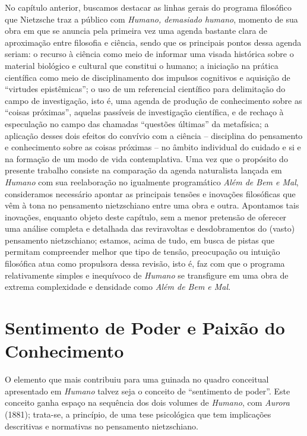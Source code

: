 \documentclass[
	12pt,				%
	openright,			%
	oneside,			%
	a4paper,			%
	english,			%
	french,				%
	spanish,			%
	brazil				%
	]{abntex2}
\begin{document}
No capítulo anterior, buscamos destacar as linhas gerais do programa filosófico que Nietzsche traz a público com \textit{Humano, demasiado humano}, momento de sua obra em que se anuncia pela primeira vez uma agenda bastante clara de aproximação entre filosofia e ciência, sendo que os principais pontos dessa agenda seriam: o recurso à ciência como meio de informar uma visada histórica sobre o material biológico e cultural que constitui o humano; a iniciação na prática científica como meio de disciplinamento dos impulsos cognitivos e aquisição de “virtudes epistêmicas”; o uso de um referencial científico para delimitação do campo de investigação, isto é, uma agenda de produção de conhecimento sobre as “coisas próximas”, aquelas passíveis de investigação científica, e de rechaço à especulação no campo das chamadas “questões últimas” da metafísica; a aplicação desses dois efeitos do convívio com a ciência – disciplina do pensamento e conhecimento sobre as coisas próximas – no âmbito individual do cuidado e si e na formação de um modo de vida contemplativa. Uma vez que o propósito do presente trabalho consiste na comparação da agenda naturalista lançada em \textit{Humano} com sua reelaboração no igualmente programático \textit{Além de Bem e Mal}, consideramos necessário apontar as principais tensões e inovações filosóficas que vêm à tona no pensamento nietzschiano entre uma obra e outra. Apontamos tais inovações, enquanto objeto deste capítulo, sem a menor pretensão de oferecer uma análise completa e detalhada das reviravoltas e desdobramentos do (vasto) pensamento nietzschiano; estamos, acima de tudo, em busca de pistas que permitam compreender melhor que tipo de tensão, preocupação ou intuição filosófica atua como propulsora dessa revisão, isto é, faz com que o programa relativamente simples e inequívoco de \textit{Humano} se transfigure em uma obra de extrema complexidade e densidade como \textit{Além de Bem e Mal}.

\section{Sentimento de Poder e Paixão do Conhecimento }

O elemento que mais contribuiu para uma guinada no quadro conceitual apresentado em \textit{Humano} talvez seja o conceito de “sentimento de poder”. Este conceito ganha espaço na sequência dos dois volumes de \textit{Humano}, com \textit{Aurora} (1881); trata-se, a princípio, de uma tese psicológica que tem implicações descritivas e normativas no pensamento nietzschiano.
\end{document}
